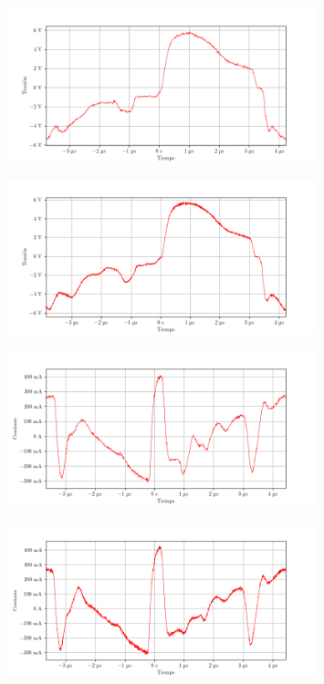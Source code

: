 \begin{figure}[ht]
    \centering
    \includegraphics[width=0.8\textwidth]{images/capturas-osciloscopio/17-11-2022/9.png}
    \caption{}
    \label{fig:osc:9}
\end{figure}

\begin{figure}[ht]
    \centering
    \includegraphics[width=0.8\textwidth]{images/capturas-osciloscopio/17-11-2022/10.png}
    \caption{}
    \label{fig:osc:10}
\end{figure}

\begin{figure}[ht]
    \centering
    \includegraphics[width=0.8\textwidth]{images/capturas-osciloscopio/17-11-2022/11.png}
    \caption{}
    \label{fig:osc:11}
\end{figure}

\begin{figure}[ht]
    \centering
    \includegraphics[width=0.8\textwidth]{images/capturas-osciloscopio/17-11-2022/12.png}
    \caption{}
    \label{fig:osc:12}
\end{figure}

